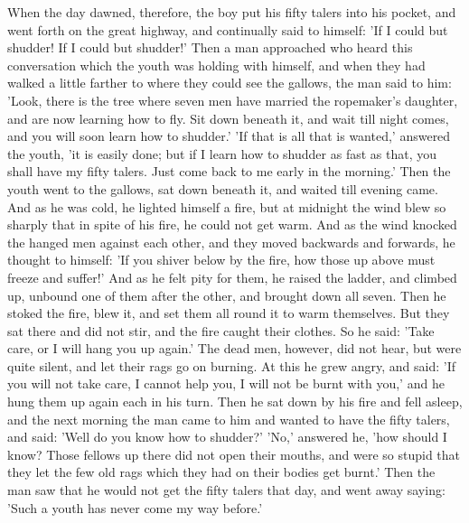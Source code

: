 \documentclass[12pt]{book}
\begin{document}
When the day dawned, therefore, the boy put his fifty talers into his
pocket, and went forth on the great highway, and continually said to
himself: 'If I could but shudder! If I could but shudder!' Then a man
approached who heard this conversation which the youth was holding
with himself, and when they had walked a little farther to where they
could see the gallows, the man said to him: 'Look, there is the tree
where seven men have married the ropemaker's daughter, and are now
learning how to fly. Sit down beneath it, and wait till night comes,
and you will soon learn how to shudder.' 'If that is all that is
wanted,' answered the youth, 'it is easily done; but if I learn how to
shudder as fast as that, you shall have my fifty talers. Just come
back to me early in the morning.' Then the youth went to the gallows,
sat down beneath it, and waited till evening came. And as he was cold,
he lighted himself a fire, but at midnight the wind blew so sharply
that in spite of his fire, he could not get warm. And as the wind
knocked the hanged men against each other, and they moved backwards
and forwards, he thought to himself: 'If you shiver below by the fire,
how those up above must freeze and suffer!' And as he felt pity for
them, he raised the ladder, and climbed up, unbound one of them after
the other, and brought down all seven. Then he stoked the fire, blew
it, and set them all round it to warm themselves. But they sat there
and did not stir, and the fire caught their clothes. So he said: 'Take
care, or I will hang you up again.' The dead men, however, did not
hear, but were quite silent, and let their rags go on burning. At this
he grew angry, and said: 'If you will not take care, I cannot help
you, I will not be burnt with you,' and he hung them up again each in
his turn. Then he sat down by his fire and fell asleep, and the next
morning the man came to him and wanted to have the fifty talers, and
said: 'Well do you know how to shudder?' 'No,' answered he, 'how
should I know? Those fellows up there did not open their mouths, and
were so stupid that they let the few old rags which they had on their
bodies get burnt.' Then the man saw that he would not get the fifty
talers that day, and went away saying: 'Such a youth has never come my
way before.'
\end{document}
